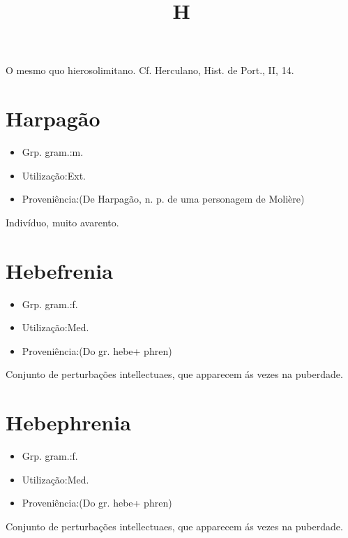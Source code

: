 \documentclass{article}
\title{H}
\begin{document}
O mesmo quo \textunderscore hierosolimitano\textunderscore . Cf. Herculano, \textunderscore Hist. de Port.\textunderscore , II, 14.
\section{Harpagão}
\begin{itemize}
\item {Grp. gram.:m.}
\end{itemize}
\begin{itemize}
\item {Utilização:Ext.}
\end{itemize}
\begin{itemize}
\item {Proveniência:(De \textunderscore Harpagão\textunderscore , n. p. de uma personagem de Molière)}
\end{itemize}
Indivíduo, muito avarento.
\section{Hebefrenia}
\begin{itemize}
\item {Grp. gram.:f.}
\end{itemize}
\begin{itemize}
\item {Utilização:Med.}
\end{itemize}
\begin{itemize}
\item {Proveniência:(Do gr. \textunderscore hebe\textunderscore  + \textunderscore phren\textunderscore )}
\end{itemize}
Conjunto de perturbações intellectuaes, que apparecem ás vezes na puberdade.
\section{Hebephrenia}
\begin{itemize}
\item {Grp. gram.:f.}
\end{itemize}
\begin{itemize}
\item {Utilização:Med.}
\end{itemize}
\begin{itemize}
\item {Proveniência:(Do gr. \textunderscore hebe\textunderscore  + \textunderscore phren\textunderscore )}
\end{itemize}
Conjunto de perturbações intellectuaes, que apparecem ás vezes na puberdade.
\end{document}
